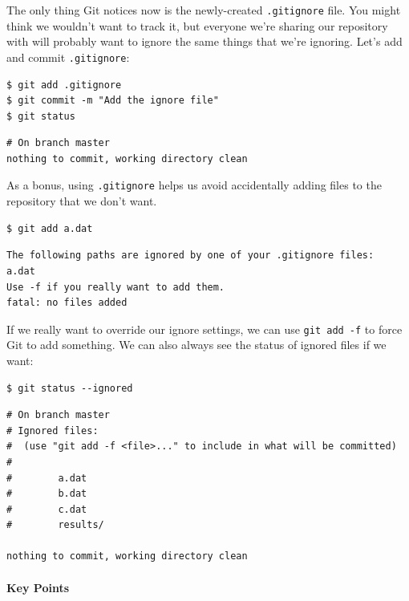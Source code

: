 \documentclass[]{book}
\begin{document}
The only thing Git notices now is the newly-created \texttt{.gitignore}
file. You might think we wouldn't want to track it, but everyone we're
sharing our repository with will probably want to ignore the same things
that we're ignoring. Let's add and commit \texttt{.gitignore}:

\begin{verbatim}
$ git add .gitignore
$ git commit -m "Add the ignore file"
$ git status
\end{verbatim}

\begin{verbatim}
# On branch master
nothing to commit, working directory clean
\end{verbatim}

As a bonus, using \texttt{.gitignore} helps us avoid accidentally adding
files to the repository that we don't want.

\begin{verbatim}
$ git add a.dat
\end{verbatim}

\begin{verbatim}
The following paths are ignored by one of your .gitignore files:
a.dat
Use -f if you really want to add them.
fatal: no files added
\end{verbatim}

If we really want to override our ignore settings, we can use
\texttt{git add -f} to force Git to add something. We can also always
see the status of ignored files if we want:

\begin{verbatim}
$ git status --ignored
\end{verbatim}

\begin{verbatim}
# On branch master
# Ignored files:
#  (use "git add -f <file>..." to include in what will be committed)
#
#        a.dat
#        b.dat
#        c.dat
#        results/

nothing to commit, working directory clean
\end{verbatim}

\mbox{}\paragraph{Key Points}
\end{document}
